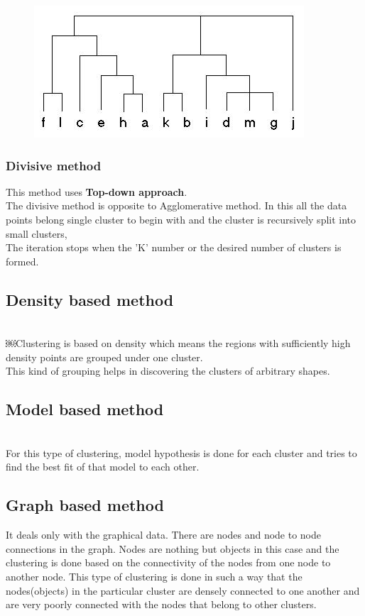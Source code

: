 \documentclass[11pt]{article}
\begin{document}
\begin{figure}\begin{center}
\includegraphics[scale=0.5]{Hierarch.jpg}
\end{center}
\end{figure}




\subsubsection{Divisive method}
This method uses \textbf{Top-down approach}.\\
The divisive method is opposite to Agglomerative method. In this all the data points belong single cluster to begin with and the cluster is recursively split into small clusters,\\
The iteration stops when the 'K' number or the desired number of clusters is formed.\\
\subsection{Density based method
}\\
￼Clustering is based on density which means the regions with sufficiently high density points are grouped under one cluster.\\
This kind of grouping helps in discovering the clusters of arbitrary shapes.\\
\subsection{Model based method}\\
For this type of clustering, model hypothesis is done for each cluster and tries to find the best fit of that model to each other.\\
\subsection{Graph based method}
  It deals only with the graphical data. There are nodes and node to node connections in the graph. Nodes are nothing but objects in this case and the clustering is done based on the connectivity of the nodes from one node to another node. This type of clustering is done in such a way that the nodes(objects) in the particular cluster are densely connected to one another and are very poorly connected with the nodes that belong to other clusters.\\
  
\end{document}

